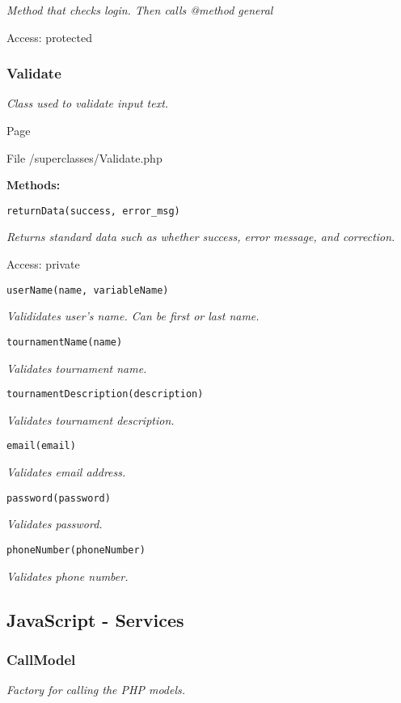 {\scriptsize
\textit{Method that checks login.
Then calls @method general}

Access: protected

}

\subsubsection{Validate}
\textit{Class used to validate input text.}

Page \pageref{Validate.php}

File /superclasses/Validate.php

\textbf{Methods:}

\texttt{returnData(success, error\_msg)}

{\scriptsize
\textit{Returns standard data such as whether success, error message, and correction.}

Access: private

}

\texttt{userName(name, variableName)}

{\scriptsize
\textit{Valididates user's name.
Can be first or last name.}

}

\texttt{tournamentName(name)}

{\scriptsize
\textit{Validates tournament name.}

}

\texttt{tournamentDescription(description)}

{\scriptsize
\textit{Validates tournament description.}

}

\texttt{email(email)}

{\scriptsize
\textit{Validates email address.}

}

\texttt{password(password)}

{\scriptsize
\textit{Validates password.}

}

\texttt{phoneNumber(phoneNumber)}

{\scriptsize
\textit{Validates phone number.}

}

\subsection{JavaScript - Services}
\subsubsection{CallModel}
\textit{Factory for calling the PHP models.}

